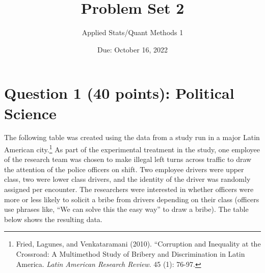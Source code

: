 \documentclass[12pt,letterpaper]{article}
\title{Problem Set 2}
\date{Due: October 16, 2022}
\author{Applied Stats/Quant Methods 1}
\begin{document}
	\maketitle
	

	
	\vspace{.5cm}
	\section*{Question 1 (40 points): Political Science}
		\vspace{.25cm}
	The following table was created using the data from a study run in a major Latin American city.\footnote{Fried, Lagunes, and Venkataramani (2010). ``Corruption and Inequality at the Crossroad: A Multimethod Study of Bribery and Discrimination in Latin America. \textit{Latin American Research Review}. 45 (1): 76-97.} As part of the experimental treatment in the study, one employee of the research team was chosen to make illegal left turns across traffic to draw the attention of the police officers on shift. Two employee drivers were upper class, two were lower class drivers, and the identity of the driver was randomly assigned per encounter. The researchers were interested in whether officers were more or less likely to solicit a bribe from drivers depending on their class (officers use phrases like, ``We can solve this the easy way'' to draw a bribe). The table below shows the resulting data.
\end{document}
